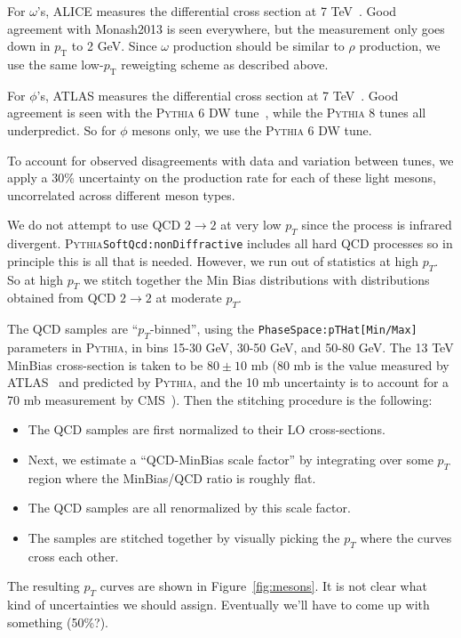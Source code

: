 \documentclass[12pt]{article}
\newcommand{\pythia}{\textsc{Pythia}\xspace}
\begin{document}
For $\omega$'s, ALICE measures the differential cross section at 7 TeV~\cite{ALICE:omega}.
Good agreement with Monash2013 is seen everywhere, but the measurement only goes down in 
$p_\mathrm{T}$ to 2 GeV. Since $\omega$ production should be similar to $\rho$ production,
we use the same low-$p_\mathrm{T}$ reweigting scheme as described above.

For $\phi$'s, ATLAS measures the differential cross section at 7 TeV~\cite{ATLAS:phi}.
Good agreement is seen with the \pythia 6 DW tune~\cite{pythia6DW}, while the \pythia 8 tunes all
underpredict. So for $\phi$ mesons only, we use the \pythia 6 DW tune.

To account for observed disagreements with data and variation between tunes, we apply
a 30\% uncertainty on the production rate for each of these light mesons, uncorrelated
across different meson types.

We do not attempt to use QCD $2 \to 2$ at very low $p_T$ since the 
process is infrared divergent.
\pythia \texttt{SoftQcd:nonDiffractive} includes all
hard QCD processes\cite{wwwPythia} so in principle this is all that is
needed.    However, we run out of statistics at high $p_T$.  So 
at high $p_T$ we stitch together the Min Bias distributions with 
distributions obtained from QCD $2 \to 2$ at moderate $p_T$.

The QCD samples are
``$p_T$-binned'', using the \texttt{PhaseSpace:pTHat[Min/Max]} parameters in \pythia, 
in bins 15-30 GeV, 30-50 GeV, and 50-80 GeV.  
The 13 TeV MinBias cross-section is taken to be $80\pm10$ mb (80 mb is the value measured by ATLAS~\cite{Atlas:ppxsec}
and predicted by \pythia, and the 10 mb uncertainty is to account for a 70 mb measurement by CMS~\cite{CMS:ppxsec}).  
Then the stitching procedure is the following:
\begin{itemize}
\item The QCD samples are first normalized to their LO cross-sections.
\item Next, we estimate a ``QCD-MinBias scale factor'' by integrating
  over some $p_T$ region where the MinBias/QCD ratio is roughly flat.
\item The QCD samples are all renormalized by this scale factor.
\item The samples are stitched together by visually picking the 
$p_T$ where the curves cross each other.
\end{itemize}
\noindent The resulting $p_T$ curves are shown in
Figure~\ref{fig:mesons}.  It is not clear what kind of uncertainties
we should assign.  Eventually we'll have to come up with something (50\%?).
\end{document}
